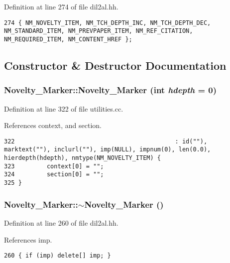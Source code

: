 Definition at line 274 of file dil2al.hh.



\footnotesize\begin{verbatim}274 { NM_NOVELTY_ITEM, NM_TCH_DEPTH_INC, NM_TCH_DEPTH_DEC, NM_STANDARD_ITEM, NM_PREVPAPER_ITEM, NM_REF_CITATION, NM_REQUIRED_ITEM, NM_CONTENT_HREF };
\end{verbatim}\normalsize 


\subsection{Constructor \& Destructor Documentation}
\subsubsection{\setlength{\rightskip}{0pt plus 5cm}Novelty\_\-Marker::Novelty\_\-Marker (int {\em hdepth} = 0)}\label{classNovelty__Marker_a0}




Definition at line 322 of file utilities.cc.

References context, and section.



\footnotesize\begin{verbatim}322                                             : id(""), marktext(""), inclurl(""), imp(NULL), impnum(0), len(0.0), hierdepth(hdepth), nmtype(NM_NOVELTY_ITEM) {
323         context[0] = "";
324         section[0] = "";
325 }
\end{verbatim}\normalsize 
{}
\subsubsection{\setlength{\rightskip}{0pt plus 5cm}Novelty\_\-Marker::$\sim$Novelty\_\-Marker ()\hspace{0.3cm}{\tt  [inline]}}\label{classNovelty__Marker_a1}




Definition at line 260 of file dil2al.hh.

References imp.



\footnotesize\begin{verbatim}260 { if (imp) delete[] imp; }
\end{verbatim}\normalsize 



